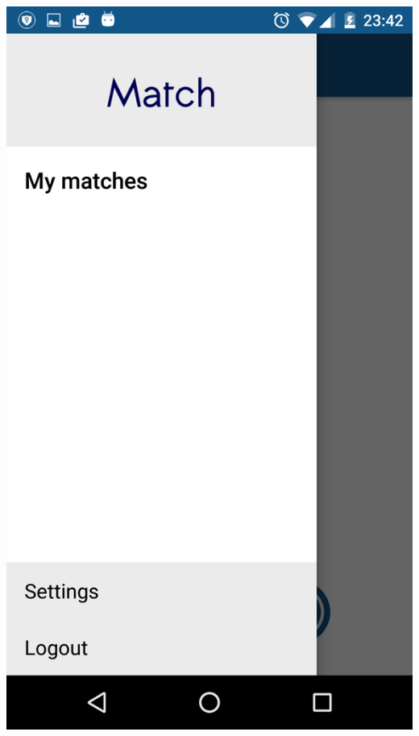 \documentclass[letterpaper,10pt,english]{sphinxmanual}
\begin{document}
\includegraphics{sidebar.png}
\end{document}
